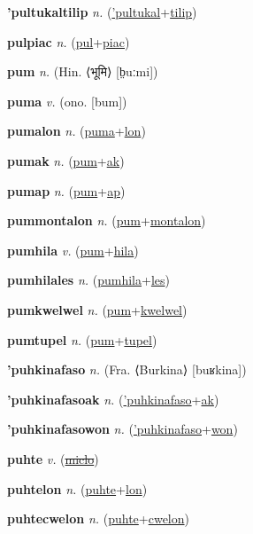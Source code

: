 \textbf{\hypertarget{'pultukaltilip}{'pultukaltilip}} \textit{n.} (\hyperlink{'pultukal}{'pultukal}+\allowbreak \hyperlink{tilip}{tilip})


\textbf{\hypertarget{pulpiac}{pulpiac}} \textit{n.} (\hyperlink{pul}{pul}+\allowbreak \hyperlink{piac}{piac})


\textbf{\hypertarget{pum}{pum}} \textit{n.} (Hin. ⟨{\devanagari{}भूमि}⟩ [b̤uːmi])


\textbf{\hypertarget{puma}{puma}} \textit{v.} (ono. [bum])


\textbf{\hypertarget{pumalon}{pumalon}} \textit{n.} (\hyperlink{puma}{puma}+\allowbreak \hyperlink{lon}{lon})


\textbf{\hypertarget{pumak}{pumak}} \textit{n.} (\hyperlink{pum}{pum}+\allowbreak \hyperlink{ak}{ak})


\textbf{\hypertarget{pumap}{pumap}} \textit{n.} (\hyperlink{pum}{pum}+\allowbreak \hyperlink{ap}{ap})


\textbf{\hypertarget{pummontalon}{pummontalon}} \textit{n.} (\hyperlink{pum}{pum}+\allowbreak \hyperlink{montalon}{montalon})


\textbf{\hypertarget{pumhila}{pumhila}} \textit{v.} (\hyperlink{pum}{pum}+\allowbreak \hyperlink{hila}{hila})


\textbf{\hypertarget{pumhilales}{pumhilales}} \textit{n.} (\hyperlink{pumhila}{pumhila}+\allowbreak \hyperlink{les}{les})


\textbf{\hypertarget{pumkwelwel}{pumkwelwel}} \textit{n.} (\hyperlink{pum}{pum}+\allowbreak \hyperlink{kwelwel}{kwelwel})


\textbf{\hypertarget{pumtupel}{pumtupel}} \textit{n.} (\hyperlink{pum}{pum}+\allowbreak \hyperlink{tupel}{tupel})


\textbf{\hypertarget{'puhkinafaso}{'puhkinafaso}} \textit{n.} (Fra. ⟨Burkina⟩ [buʁkina])


\textbf{\hypertarget{'puhkinafasoak}{'puhkinafasoak}} \textit{n.} (\hyperlink{'puhkinafaso}{'puhkinafaso}+\allowbreak \hyperlink{ak}{ak})


\textbf{\hypertarget{'puhkinafasowon}{'puhkinafasowon}} \textit{n.} (\hyperlink{'puhkinafaso}{'puhkinafaso}+\allowbreak \hyperlink{won}{won})


\textbf{\hypertarget{puhte}{puhte}} \textit{v.} (\hyperlink{miclo}{\sout{miclo}})


\textbf{\hypertarget{puhtelon}{puhtelon}} \textit{n.} (\hyperlink{puhte}{puhte}+\allowbreak \hyperlink{lon}{lon})


\textbf{\hypertarget{puhtecwelon}{puhtecwelon}} \textit{n.} (\hyperlink{puhte}{puhte}+\allowbreak \hyperlink{cwelon}{cwelon})


